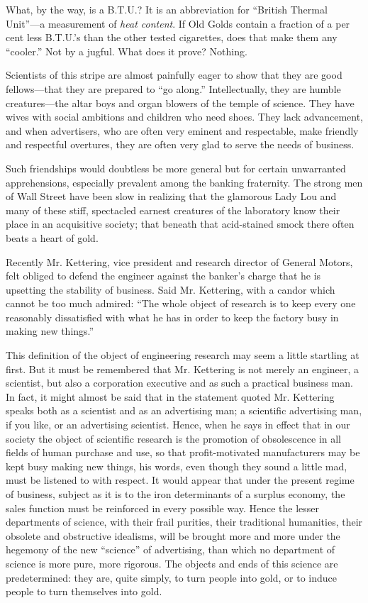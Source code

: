 \documentclass[openany,nobib]{tufte-book}
\begin{document}
What, by the way, is a B.T.U.? It is an abbreviation for ``British
Thermal Unit''---a measurement of \emph{heat content}. If Old Golds
contain a fraction of a per cent less B.T.U.'s than the other tested
cigarettes, does that make them any ``cooler.'' Not by a jugful. What
does it prove? Nothing.

Scientists of this stripe are almost painfully eager to show that they
are good fellows---that they are prepared to ``go along.''
Intellectually, they are humble creatures---the altar boys and organ
blowers of the temple of science. They have wives with social ambitions
and children who need shoes. They lack advancement, and when
advertisers, who are often very eminent and respectable, make friendly
and respectful overtures, they are often very glad to serve the needs of
business.

Such friendships would doubtless be more general but for certain
unwarranted apprehensions, especially prevalent among the banking
fraternity. The strong men of Wall Street have been slow in realizing
that the glamorous Lady Lou and many of these stiff, spectacled earnest
creatures of the laboratory know their place in an acquisitive society;
that beneath that acid-stained smock there often beats a heart of gold.

Recently Mr. Kettering, vice president and research director of General
Motors, felt obliged to defend the engineer against the banker's charge
that he is upsetting the stability of business. Said Mr. Kettering, with
a candor which cannot be too much admired: ``The whole object of
research is to keep every one reasonably dissatisfied with what he has
in order to keep the factory busy in making new things.''

This definition of the object of engineering research may seem a little
startling at first. But it must be remembered that Mr. Kettering is not
merely an engineer, a scientist, but also a corporation executive and as
such a practical business man. In fact, it might almost be said that in
the statement quoted Mr. Kettering speaks both as a scientist and as an
advertising man; a scientific advertising man, if you like, or an
advertising scientist. Hence, when he says in effect that in our society
the object of scientific research is the promotion of obsolescence in
all fields of human purchase and use, so that profit-motivated
manufacturers may be kept busy making new things, his words, even though
they sound a little mad, must be listened to with respect. It would
appear that under the present regime of business, subject as it is to
the iron determinants of a surplus economy, the sales function must be
reinforced in every possible way. Hence the lesser departments of
science, with their frail purities, their traditional humanities, their
obsolete and obstructive idealisms, will be brought more and more under
the hegemony of the new ``science'' of advertising, than which no
department of science is more pure, more rigorous. The objects and ends
of this science are predetermined: they are, quite simply, to turn
people into gold, or to induce people to turn themselves into gold.
\end{document}
